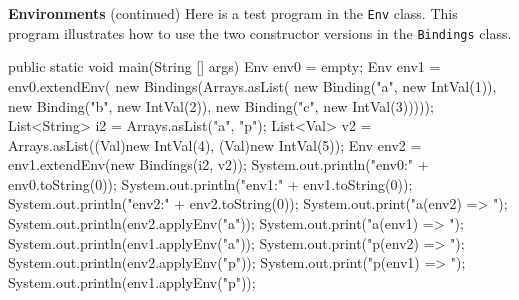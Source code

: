 \begin{minipage}[t]{\sw}
\slidenumber
\LARGE
{\bf Environments} (continued)\exx
\Large
Here is a test program in the \verb'Env' class.
This program illustrates how to use the two constructor versions
in the \verb'Bindings' class.
\large
\begin{qv}
    public static void main(String [] args) {
        Env env0 = empty;
        Env env1 = env0.extendEnv(
            new Bindings(Arrays.asList(
                new Binding("a", new IntVal(1)),
                new Binding("b", new IntVal(2)),
                new Binding("c", new IntVal(3)))));
        List<String> i2 = Arrays.asList("a", "p");
        List<Val> v2 = Arrays.asList((Val)new IntVal(4), (Val)new IntVal(5));
        Env env2 = env1.extendEnv(new Bindings(i2, v2));
        System.out.println("env0:\n" + env0.toString(0));
        System.out.println("env1:\n" + env1.toString(0));
        System.out.println("env2:\n" + env2.toString(0));
        System.out.print("a(env2) => "); System.out.println(env2.applyEnv("a"));
        System.out.print("a(env1) => "); System.out.println(env1.applyEnv("a"));
        System.out.print("p(env2) => "); System.out.println(env2.applyEnv("p"));
        System.out.print("p(env1) => "); System.out.println(env1.applyEnv("p"));
    }
\end{qv}
\end{minipage}
\clearpage
